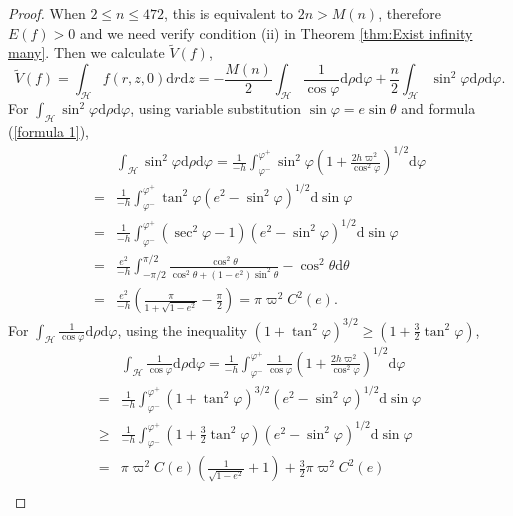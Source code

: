 \documentclass[11pt]{amsart}
\newcommand{\om}{\varpi}
\begin{document}
\begin{proof}
When $2\leq n\leq472$, this is equivalent to $2n>M(n)$, therefore $E(f)>0$ and we need verify condition (ii) in Theorem \ref{thm:Exist infinity many}. Then we calculate $\tilde{V}(f)$,
	\begin{equation*}
	 	\tilde{V}(f)=\int_{\mathcal{H}}f(r,z,0)\mathrm{d}r\mathrm{d}z=-\frac{M(n)}{2}\int_{\mathcal{H}}\frac{1}{\cos\varphi}\mathrm{d}\rho\mathrm{d}\varphi+\frac{n}{2}\int_{\mathcal{H}}\sin^2\varphi\mathrm{d}\rho\mathrm{d}\varphi.
	\end{equation*}
For $\int_{\mathcal{H}}\sin^2\varphi\mathrm{d}\rho\mathrm{d}\varphi$, using variable substitution $\sin\varphi=e\sin\theta$ and formula (\ref{formula 1}),
\begin{equation*}
	\begin{aligned}
		&\int_{\mathcal{H}}\sin^2\varphi\mathrm{d}\rho\mathrm{d}\varphi=\frac{1}{-h}\int_{\varphi^-}^{\varphi^+}\sin^2\varphi\left(1+\frac{2h\om^2}{\cos^2\varphi}\right)^{1/2}\mathrm{d}\varphi\\
		=&\frac{1}{-h}\int_{\varphi^-}^{\varphi^+}\tan^2\varphi(e^2-\sin^2\varphi)^{1/2}\mathrm{d}\sin\varphi\\
		=&\frac{1}{-h}\int_{\varphi^-}^{\varphi^+}(\sec^2\varphi-1)(e^2-\sin^2\varphi)^{1/2}\mathrm{d}\sin\varphi\\
		=&\frac{e^2}{-h}\int_{-\pi/2}^{\pi/2}\frac{\cos^2\theta}{\cos^2\theta+(1-e^2)\sin^2\theta}-\cos^2\theta\mathrm{d}\theta\\
		=&\frac{e^2}{-h}\left(\frac{\pi}{1+\sqrt{1-e^2}}-\frac{\pi}{2}\right)=\pi\om^2C^2(e).
	\end{aligned}
\end{equation*}
For $\int_{\mathcal{H}}\frac{1}{\cos\varphi}\mathrm{d}\rho\mathrm{d}\varphi$, using the inequality $(1+\tan^2\varphi)^{3/2}\geq(1+\frac{3}{2}\tan^2\varphi)$,
\begin{equation*}
	\begin{aligned}
		&\int_{\mathcal{H}}\frac{1}{\cos\varphi}\mathrm{d}\rho\mathrm{d}\varphi=\frac{1}{-h}\int_{\varphi^-}^{\varphi^+}\frac{1}{\cos\varphi}\left(1+\frac{2h\om^2}{\cos^2\varphi}\right)^{1/2}\mathrm{d}\varphi\\
		=&\frac{1}{-h}\int_{\varphi^-}^{\varphi^+}(1+\tan^2\varphi)^{3/2}(e^2-\sin^2\varphi)^{1/2}\mathrm{d}\sin\varphi\\
		\geq&\frac{1}{-h}\int_{\varphi^-}^{\varphi^+}(1+\frac{3}{2}\tan^2\varphi)(e^2-\sin^2\varphi)^{1/2}\mathrm{d}\sin\varphi\\
		=&\pi\om^2C(e)\left(\frac{1}{\sqrt{1-e^2}}+1\right)+\frac{3}{2}\pi\om^2C^2(e)\\

\end{aligned}
\end{equation*}
\end{proof}
\end{document}
